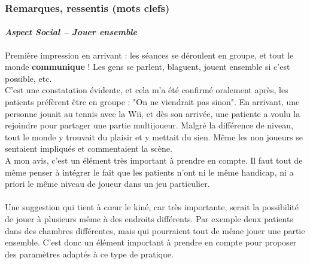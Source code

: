 	\subsubsection*{Remarques, ressentis (mots clefs) }
		\paragraph{\emph{Aspect Social – Jouer ensemble}\\}
Première impression en arrivant : les séances se déroulent en groupe, et tout le monde \textbf{communique} !
Les gens se parlent, blaguent, jouent ensemble si c'est possible, etc. \\
C'est une constatation évidente, et cela m'a été confirmé oralement après, les patients préfèrent être en groupe : "On ne viendrait pas sinon". En arrivant, une personne jouait au tennis avec la Wii, et dès son arrivée, une patiente a voulu la rejoindre pour partager une partie multijoueur. Malgré la différence de niveau, tout le monde y trouvait du plaisir et y mettait du sien. Même les non joueurs se sentaient impliqués et commentaient la scène. \\
A mon avis, c'est un élément très important à prendre en compte. Il faut tout de même penser à intégrer le fait que les patients n'ont ni le même handicap, ni a priori le même niveau de joueur dans un jeu particulier.

\paragraph{}Une suggestion qui tient à cœur le kiné, car très importante, serait la possibilité de jouer à plusieurs même à des endroits différents. Par exemple deux patients dans des chambres différentes, mais qui pourraient tout de même jouer une partie ensemble. C'est donc un élément important à prendre en compte pour proposer des paramètres adaptés à ce type de pratique.

